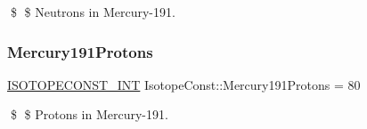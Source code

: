 \$ \$ Neutrons in Mercury-\/191. \mbox{\label{group___isotope_const-_mercury-_hg191_gaf8cbeccc3fc03c10e6970ee7690baca4}} 
\subsubsection{\texorpdfstring{Mercury191\+Protons}{Mercury191Protons}}
{\footnotesize\ttfamily \mbox{\hyperlink{group___isotope_const-_macros_ga5f18360b3e99483a35c32d789e62621c}{I\+S\+O\+T\+O\+P\+E\+C\+O\+N\+S\+T\+\_\+\+I\+NT}} Isotope\+Const\+::\+Mercury191\+Protons = 80}

\$ \$ Protons in Mercury-\/191. 